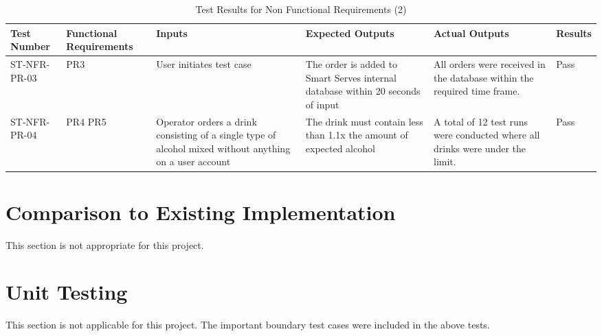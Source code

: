 \documentclass[12pt, titlepage]{article}
\begin{document}
    \begin{rotate}{}
    \begin{landscape}
        \begin{table}
           \begin{tabular}{|p{2.75cm}|p{2.5cm}|p{4cm}|p{4.75cm}|p{4.25cm}|p{1.5cm}|}
            \hline
            Test Number & Functional \newline Requirements & Inputs & Expected Outputs & Actual Outputs & Results  \\ [0.5ex]
            \hline\hline
            ST-NFR-PR-03 & PR3 & User initiates test case & The order is added to Smart Serves internal database within 20 seconds of input & All orders were received in the database within the required time frame. & Pass \\
            \hline
            ST-NFR-PR-04 & PR4 \newline PR5 & Operator orders a drink consisting of a single type of alcohol mixed without anything on a user account & The drink must contain less than 1.1x the amount of expected alcohol & A total of 12 test runs were conducted where all drinks were under the limit. & Pass \\
            \hline
            \hline
            \end{tabular}
            \caption{Test Results for Non Functional Requirements (2)}
            \label{tab: caption}
        \end{table}
     \end{landscape}
    \end{rotate}



	
\section{Comparison to Existing Implementation}	

This section is not appropriate for this project.

\section{Unit Testing}
This section is not applicable for this project. The important boundary test cases were included in the above tests.
\end{document}
